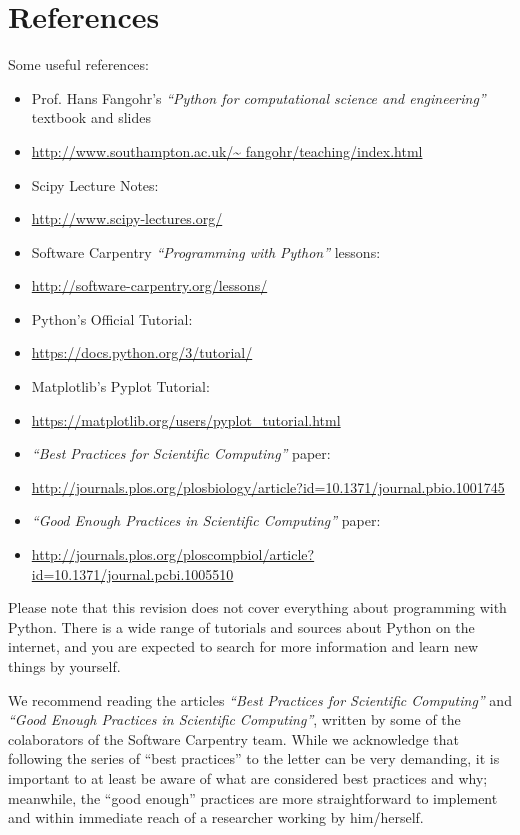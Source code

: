 \section{References}

Some useful references:
\begin{itemize}
	\item Prof. Hans Fangohr's \emph{``Python for computational science and engineering''} textbook and slides
	\item[] {\footnotesize \url{http://www.southampton.ac.uk/~ fangohr/teaching/index.html}}
	
	\item Scipy Lecture Notes:
	\item[] {\footnotesize \url{http://www.scipy-lectures.org/}}
	
	\item Software Carpentry \emph{``Programming with Python''} lessons:
	\item[] {\footnotesize \url{http://software-carpentry.org/lessons/}}

	\item Python's Official Tutorial:
	\item[] {\footnotesize \url{https://docs.python.org/3/tutorial/}}
	
	\item Matplotlib's Pyplot Tutorial:
	\item[] {\footnotesize \url{https://matplotlib.org/users/pyplot_tutorial.html}}
	
	\item \emph{``Best Practices for Scientific Computing''} paper:
	\item[] {\footnotesize \url{http://journals.plos.org/plosbiology/article?id=10.1371/journal.pbio.1001745}}
	
	\item \emph{``Good Enough Practices in Scientific Computing''} paper:
	\item[] {\footnotesize \url{http://journals.plos.org/ploscompbiol/article?id=10.1371/journal.pcbi.1005510}}
\end{itemize}

Please note that this revision does not cover everything about programming with Python. There is a wide range of tutorials and sources about Python on the internet, and you are expected to search for more information and learn new things by yourself.

We recommend reading the articles \emph{``Best Practices for Scientific Computing''} and \emph{``Good Enough Practices in Scientific Computing''}, written by some of the colaborators of the Software Carpentry team. While we acknowledge that following the series of ``best practices'' to the letter can be very demanding, it is important to at least be aware of what are considered best practices and why; meanwhile, the ``good enough'' practices are more straightforward to implement and within immediate reach of a researcher working by him/herself.
